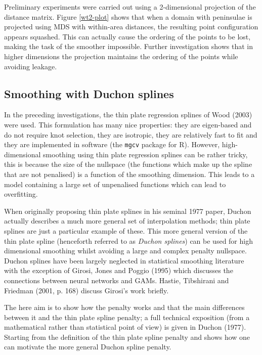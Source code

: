 \documentclass[useAMS,referee, usegraphicx]{biom}
\begin{document}
Preliminary experiments were carried out using a 2-dimensional projection of the distance matrix. Figure \ref{wt2-plot} shows that when a domain with peninsulae is projected using MDS with within-area distances, the resulting point configuration appears squashed. This can actually cause the ordering of the points to be lost, making the task of the smoother impossible. Further investigation shows that in higher dimensions the projection maintains the ordering of the points while avoiding leakage.

\subsection{Smoothing with Duchon splines}

In the preceding investigations, the thin plate regression splines of Wood (2003) were used. This formulation has many nice properties: they are eigen-based and do not require knot selection, they are isotropic, they are relatively fast to fit and they are implemented in software (the \texttt{mgcv} package for \textsf{R}). However, high-dimensional smoothing using thin plate regression splines can be rather tricky, this is because the size of the nullspace (the functions which make up the spline that are not penalised) is a function of the smoothing dimension. This leads to a model containing a large set of unpenalised functions which can lead to overfitting.

When originally proposing thin plate splines in his seminal 1977 paper, Duchon actually describes a much more general set of interpolation methods; thin plate splines are just a particular example of these. This more general version of the thin plate spline (henceforth referred to as \textit{Duchon splines}) can be used for high dimensional smoothing whilst avoiding a large and complex penalty nullspace. Duchon splines have been largely neglected in statistical smoothing literature with the exception of Girosi, Jones and Poggio (1995) which discusses the connections between neural networks and GAMs. Hastie, Tibshirani and Friedman (2001, p. 168) discuss Girosi's work briefly.

The here aim is to show how the penalty works and that the main differences between it and the thin plate spline penalty; a full technical exposition (from a mathematical rather than statistical point of view) is given in Duchon (1977). Starting from the definition of the thin plate spline penalty and shows how one can motivate the more general Duchon spline penalty. 
\end{document}
